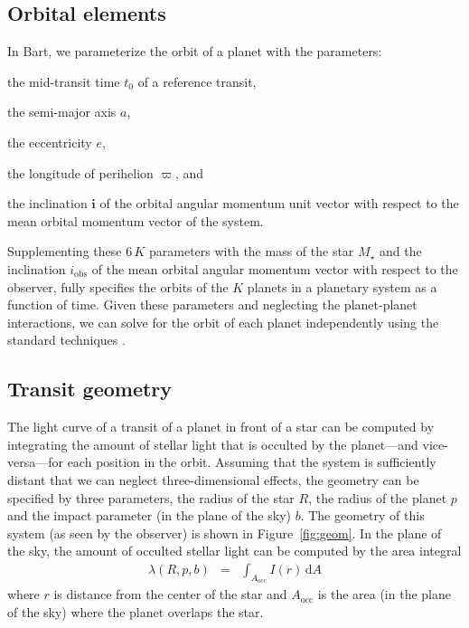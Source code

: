 \documentclass[12pt,preprint]{aastex}
\newcommand{\project}[1]{{\sffamily #1}}
\newcommand{\bart}{\project{Bart}}
\newcommand{\Fig}[1]{Figure~\ref{fig:#1}}
\newcommand{\fig}[1]{\Fig{#1}}
\newcommand{\eqlabel}[1]{\label{eq:#1}}
\newcommand{\dd}{\ensuremath{\mathrm{d}}}
\newcommand{\bvec}[1]{\ensuremath{\boldsymbol{#1}}}
\begin{document}
\subsection{Orbital elements}

In \bart, we parameterize the orbit of a planet with the parameters:
\begin{itemize}
    {\item the mid-transit time $t_0$ of a reference transit,}
    {\item the semi-major axis $a$,}
    {\item the eccentricity $e$,}
    {\item the longitude of perihelion $\varpi$, and}
    {\item the inclination $\bvec{i}$ of the orbital angular momentum unit
           vector with respect to the mean orbital momentum vector of the
           system.}
\end{itemize}
Supplementing these $6\,K$ parameters with the mass of the star $M_\star$ and
the inclination $i_\mathrm{obs}$ of the mean orbital angular momentum vector
with respect to the observer, fully specifies the orbits of the $K$ planets in
a planetary system as a function of time.
Given these parameters and neglecting the planet-planet interactions, we can
solve for the orbit of each planet independently using the standard techniques
\citep[see][for example]{goldstein}.


\subsection{Transit geometry}

The light curve of a transit of a planet in front of a star can be computed by
integrating the amount of stellar light that is occulted by the planet---and
vice-versa---for each position in the orbit.
Assuming that the system is sufficiently distant that we can neglect
three-dimensional effects, the geometry can be specified by three parameters,
the radius of the star $R$, the radius of the planet $p$ and the impact
parameter (in the plane of the sky) $b$.
The geometry of this system (as seen by the observer) is shown in \fig{geom}.
In the plane of the sky, the amount of occulted stellar light can be computed
by the area integral
\begin{eqnarray}\eqlabel{general-occ}
    \lambda (R, p, b) & = & \int_{A_\mathrm{occ}} I(r) \, \dd A
\end{eqnarray}
where $r$ is distance from the center of the star and $A_\mathrm{occ}$ is the
area (in the plane of the sky) where the planet overlaps the star.
\end{document}
